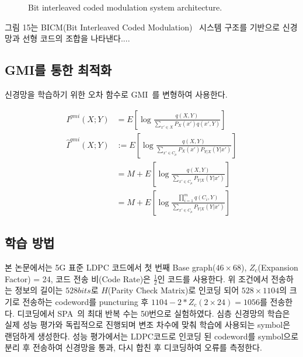 \documentclass[11pt]{oblivoir}
\begin{document}
\begin{figure}[h!]
\footnotesize
\centering
\DrawBicmArchitecture
\caption{Bit interleaved coded modulation system architecture.}
\label{fig:system}
\end{figure}

그림 15는 BICM(Bit Interleaved Coded Modulation)~\cite{caire--taricco--biglieri1998, Martinez--Guillen--Caire--Willems2009} 시스템 구조를 기반으로 신경망과 선형 코드의 조합을 나타낸다....

\subsection{GMI를 통한 최적화}

신경망을 학습하기 위한 오차 함수로 GMI~\cite{Merhav1994, Martinez--Guillen--Caire--Willems2009}를 변형하여 사용한다. 

\begin{align}
    I^{gmi}(X;Y) &= E\left[\log\frac{q(X, Y)}{\sum_{x'\in X }P_X(x')q(x', Y)}\right]\\
    \hat{I}^{gmi}(X;Y) &:= E\left[\log\frac{q(X, Y)}{\sum_{x'\in C_{\mu} }P_X(x')P_{Y|X}(Y|x')}\right]\\
    &=M +E\left[\log\frac{q(X, Y)}{\sum_{x'\in C_{\mu} }P_{Y|X}(Y|x')}\right]\\
    &=M+E\left[\log\frac{\prod_{i=1}^m q(C_i, Y)}{\sum_{x'\in C_{\mu} }P_{Y|X}(Y|x')}\right]
\end{align}


\subsection{학습 방법}

본 논문에서는 5G 표준 LDPC 코드에서 첫 번째 Base graph($46 \times 68$), $Z_c$(Expansion Factor) = 24, 코드 전송 비(Code Rate)은 $\frac{1}{2}$인 코드를 사용한다. 위 조건에서 전송하는 정보의 길이는 $528 bits$로 $H$(Parity Check Matrix)로 인코딩 되어 $528\times1104$의 크기로 전송하는 codeword를 puncturing 후 $1104-2*Z_c(2\times 24)= 1056$를 전송한다.
디코딩에서 SPA~\cite{kschischang2001factor}의 최대 반복 수는 50번으로 실험하였다. 심층 신경망의 학습은 실제 성능 평가와 독립적으로 진행되며 변조 차수에 맞춰 학습에 사용되는 symbol은 랜덤하게 생성한다. 성능 평가에서는 LDPC코드로 인코딩 된 codeword를 symbol으로 분리 후 전송하여 신경망을 통과, 다시 합친 후 디코딩하여 오류를 측정한다.
\end{document}

